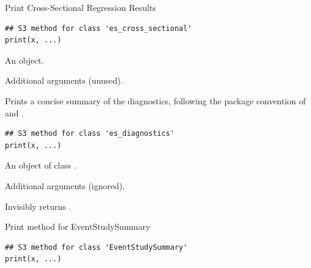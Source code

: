 \documentclass[a4paper]{book}
\begin{document}
%
\begin{Description}
Print Cross-Sectional Regression Results
\end{Description}
%
\begin{Usage}
\begin{verbatim}
## S3 method for class 'es_cross_sectional'
print(x, ...)
\end{verbatim}
\end{Usage}
%
\begin{Arguments}
\begin{ldescription}
\item[\code{x}] An  object.

\item[\code{...}] Additional arguments (unused).
\end{ldescription}
\end{Arguments}
%
\begin{Description}
Prints a concise summary of the diagnostics, following the package
convention of  and .
\end{Description}
%
\begin{Usage}
\begin{verbatim}
## S3 method for class 'es_diagnostics'
print(x, ...)
\end{verbatim}
\end{Usage}
%
\begin{Arguments}
\begin{ldescription}
\item[\code{x}] An object of class .

\item[\code{...}] Additional arguments (ignored).
\end{ldescription}
\end{Arguments}
%
\begin{Value}
Invisibly returns .
\end{Value}
%
\begin{Description}
Print method for EventStudySummary
\end{Description}
%
\begin{Usage}
\begin{verbatim}
## S3 method for class 'EventStudySummary'
print(x, ...)
\end{verbatim}
\end{Usage}
\end{document}
